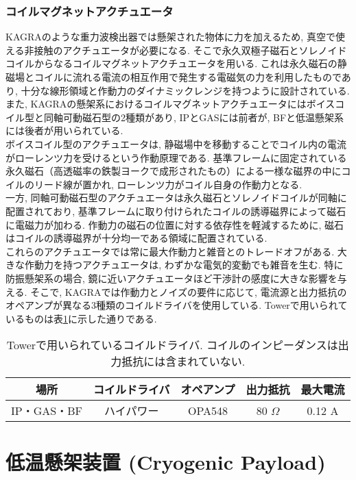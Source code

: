 \subsubsection{コイルマグネットアクチュエータ}
\label{sec4.1.2.4}
\vskip3mm
KAGRAのような重力波検出器では懸架された物体に力を加えるため, 真空で使える非接触のアクチュエータが必要になる. そこで永久双極子磁石とソレノイドコイルからなるコイルマグネットアクチュエータを用いる. これは永久磁石の静磁場とコイルに流れる電流の相互作用で発生する電磁気の力を利用したものであり, 十分な線形領域と作動力のダイナミックレンジを持つように設計されている. また, KAGRAの懸架系におけるコイルマグネットアクチュエータにはボイスコイル型と同軸可動磁石型の2種類があり\cite{41}, IPとGASには前者が, BFと低温懸架系には後者が用いられている. \\
\quad ボイスコイル型のアクチュエータは, 静磁場中を移動することでコイル内の電流がローレンツ力を受けるという作動原理である. 基準フレームに固定されている永久磁石（高透磁率の鉄製ヨークで成形されたもの）による一様な磁界の中にコイルのリード線が置かれ, ローレンツ力がコイル自身の作動力となる. \\
\quad 一方, 同軸可動磁石型のアクチュエータは永久磁石とソレノイドコイルが同軸に配置されており, 基準フレームに取り付けられたコイルの誘導磁界によって磁石に電磁力が加わる. 作動力の磁石の位置に対する依存性を軽減するために, 磁石はコイルの誘導磁界が十分均一である領域に配置されている. \\
\quad これらのアクチュエータでは常に最大作動力と雑音とのトレードオフがある. 大きな作動力を持つアクチュエータは, わずかな電気的変動でも雑音を生む. 特に防振懸架系の場合, 鏡に近いアクチュエータほど干渉計の感度に大きな影響を与える. そこで, KAGRAでは作動力とノイズの要件に応じて, 電流源と出力抵抗のオペアンプが異なる3種類のコイルドライバを使用している. Towerで用いられているものは表\ref{table4.3}に示した通りである. 
\begin{table}[H]
 \centering
  \begin{tabular}{ccccc}
   \hline\hline
   場所        & コイルドライバ & オペアンプ & 出力抵抗  & 最大電流 \\
   \hline
   IP・GAS・BF & ハイパワー     & OPA548     & 80 $\Omega$ & 0.12 A \\
   \hline
  \end{tabular}
 \caption[コイルドライバ（Tower）]{Towerで用いられているコイルドライバ. コイルのインピーダンスは出力抵抗には含まれていない. }
 \label{table4.3}
\end{table}

\section{低温懸架装置 (Cryogenic Payload)}
